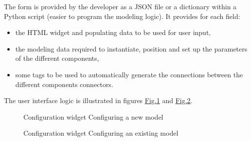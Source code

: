 \documentclass[letterpaper,10pt, openany,english]{sphinxmanual}
\begin{document}
The form is provided by the developer as a JSON file or a dictionary within a Python script (easier to program the modeling logic).
It provides for each field:
\begin{itemize}
\item {} 
the HTML widget and populating data to be used for user input,

\item {} 
the modeling data required to instantiate, position and set up the parameters of the different components,

\item {} 
some tags to be used to automatically generate the connections between the different components connectors.

\end{itemize}

The user interface logic is illustrated in figures \hyperref[\detokenize{requirements:screen-conf-0}]{Fig.\@ \ref{\detokenize{requirements:screen-conf-0}}} and \hyperref[\detokenize{requirements:screen-conf-1}]{Fig.\@ \ref{\detokenize{requirements:screen-conf-1}}}.

\begin{figure}[htbp]
\centering
\capstart

\noindent{}
\caption{Configuration widget \textendash{} Configuring a new model}\label{\detokenize{requirements:id8}}\label{\detokenize{requirements:screen-conf-0}}\end{figure}

\begin{figure}[htbp]
\centering
\capstart

\noindent{}
\caption{Configuration widget \textendash{} Configuring an existing model}\label{\detokenize{requirements:id9}}\label{\detokenize{requirements:screen-conf-1}}\end{figure}
\end{document}
